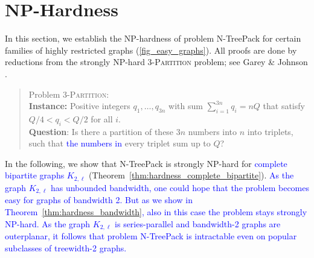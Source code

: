 \documentclass[runningheads]{llncs}
\newcommand{\xxxNTP}{{\sc N-TreePack}}
\newcommand{\lasse}[1]{\textcolor{blue}{#1}}
\begin{document}
\section{NP-Hardness}
\label{sec:hardness}
In this section, we establish the NP-hardness of problem {\xxxNTP} for certain families of
highly restricted graphs (\cref{fig_easy_graphs}). 
All proofs are done by reductions from the strongly NP-hard \textsc{3-Partition} problem;
see Garey \& Johnson \cite{garey1979computers}. 
\begin{quote}
Problem \textsc{3-Partition}: 
\\
\textbf{Instance:} Positive integers $q_1,\ldots,q_{3n}$ with sum $\sum_{i=1}^{3n}q_i=nQ$ that satisfy 
$Q/4<q_i<Q/2$ for all $i$.
\\
\textbf{Question}: Is there a partition of these $3n$ numbers into $n$ into triplets, such that \lasse{the numbers in} 
every triplet sum up to $Q$?  
\end{quote}
In the following, we show that {\xxxNTP} is strongly NP-hard for \lasse{complete bipartite graphs $K_{2,\ell}$} (Theorem~\ref{thm:hardness_complete_bipartite}). \lasse{As the graph $K_{2,\ell}$ has unbounded bandwidth, one could hope that the problem becomes easy for graphs of bandwidth 2. But as we show in Theorem~\ref{thm:hardness_bandwidth}, also in this case the problem stays strongly NP-hard. As the graph $K_{2,\ell}$ is series-parallel and bandwidth-2 graphs are outerplanar, it follows that problem {\xxxNTP} is intractable even on popular subclasses of treewidth-2 graphs. }
\end{document}
